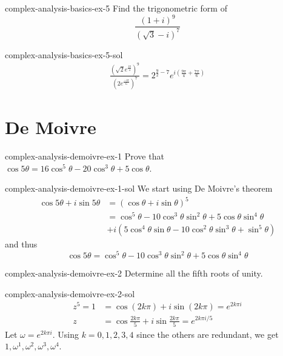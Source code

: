 \documentclass[preview]{standalone}
\begin{document}
\begin{snippetexercise}{complex-analysis-basics-ex-5}{}
    Find the trigonometric form of
    \[
        \frac{{(1+i)}^9}{{(\sqrt{3}-i)}^7}
    \]
\end{snippetexercise}

\begin{snippetsolution}{complex-analysis-basics-ex-5-sol}{}
    \begin{align*}
        \frac{{\left(\sqrt{2}e^{\frac{i\pi}{4}}\right)}^9}{{\left(2e^{\frac{-i\pi}{6}}\right)}^7}
        = 2^{\frac{9}{2}-7}e^{i\left(\frac{9\pi}{4} + \frac{7\pi}{6}\right)}
    \end{align*}
\end{snippetsolution}

\section{De Moivre}

\begin{snippetexercise}{complex-analysis-demoivre-ex-1}{} %
    Prove that \(\cos5\theta = 16\cos^5\theta - 20\cos^3\theta+5\cos\theta\).
\end{snippetexercise}

\begin{snippetsolution}{complex-analysis-demoivre-ex-1-sol}{}
    We start using De Moivre's theorem
    \begin{align*}
        \cos5\theta + i\sin5\theta &= (\cos\theta + i\sin\theta)^5 \\
        &= \cos^5\theta - 10\cos^3\theta\sin^2\theta + 5\cos\theta\sin^4\theta \\
            &+ i(5\cos^4\theta\sin\theta -10\cos^2\theta\sin^3\theta + \sin^5\theta)
    \end{align*}
    and thus
    \[ \cos5\theta = \cos^5\theta - 10\cos^3\theta\sin^2\theta + 5\cos\theta\sin^4\theta \]
\end{snippetsolution}

\begin{snippetexercise}{complex-analysis-demoivre-ex-2}{} %
    Determine all the fifth roots of unity.
\end{snippetexercise}

\begin{snippetsolution}{complex-analysis-demoivre-ex-2-sol}{}
    \begin{align*}
        z^5 = 1 &= \cos (2k\pi) + i\sin(2k\pi) = e^{2k\pi i} \\
        z &= \cos \frac{2k\pi}{5} + i \sin \frac{2k\pi}{5} = e^{2k\pi i / 5}
    \end{align*}
    Let \(\omega = e^{2k\pi i}\). Using \(k=0,1,2,3,4\) since the others are redundant, we get
    \(1, \omega^1, \omega^2, \omega^3, \omega^4\).
\end{snippetsolution}
\end{document}
